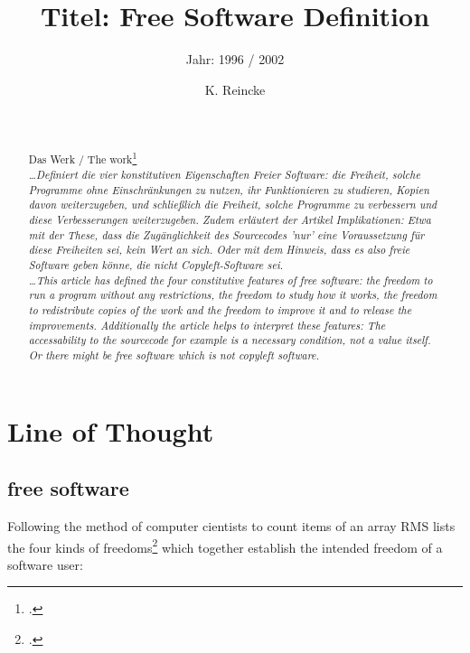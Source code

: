 \documentclass[DIV=calc,BCOR=5mm,11pt,headings=small,oneside,abstract=true, toc=bib]{scrartcl}
\begin{document}

\titlehead{Literaturexzerpt}
\subject{Autor(en): Stallman / Stallman1996a}
\title{Titel: Free Software Definition}
\subtitle{Jahr: 1996 / 2002 }
\author{K. Reincke}

\maketitle

\begin{abstract}
\noindent
\cite[(in:)][]{StaGay2002a} \\
\noindent
\cite[(ist:)][]{Stallman1996a} \\
Das Werk / The work\footcite[][]{Stallman1996a} \\
\noindent \itshape
\ldots  Definiert die vier konstitutiven Eigenschaften Freier Software: die
Freiheit, solche Programme ohne Einschränkungen zu nutzen, ihr Funktionieren zu
studieren, Kopien davon weiterzugeben, und schließlich die Freiheit, solche
Programme zu verbessern und diese Verbesserungen weiterzugeben. Zudem erläutert
der Artikel Implikationen: Etwa mit der These, dass die Zugänglichkeit des
Sourcecodes 'nur' eine Voraussetzung für diese Freiheiten sei, kein Wert an
sich. Oder mit dem Hinweis, dass es also freie Software geben könne, die nicht
Copyleft-Software sei.\\
\noindent
\ldots This article has defined the four constitutive features of free software:
the freedom to run a program without any restrictions, the freedom to study how
it works, the freedom to redistribute copies of the work and the freedom to
improve it and to release the improvements. Additionally the article helps to
interpret these features: The accessability to the sourcecode for example is a
necessary condition, not a value itself. Or there might be free software which
is not copyleft software.
\end{abstract}
\footnotesize
\normalsize

\section{Line of Thought}

\subsection{free software}
Following the method of computer cientists to count items of an array RMS lists
the \glqq{}four kinds of freedoms\grqq{}\footcite[cf][41]{Stallman1996a}  which
together establish the intended freedom of a software user:
\end{document}

